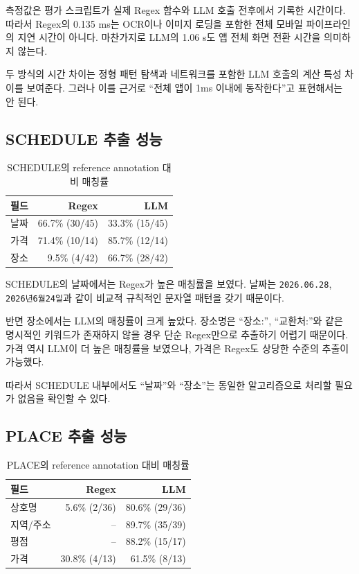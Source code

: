 \documentclass[11pt,a4paper]{article}
\begin{document}
측정값은 평가 스크립트가 실제 Regex 함수와 LLM 호출 전후에서 기록한 시간이다. 따라서 Regex의 0.135 ms는 OCR이나 이미지 로딩을 포함한 전체 모바일 파이프라인의 지연 시간이 아니다. 마찬가지로 LLM의 1.06 s도 앱 전체 화면 전환 시간을 의미하지 않는다.

두 방식의 시간 차이는 정형 패턴 탐색과 네트워크를 포함한 LLM 호출의 계산 특성 차이를 보여준다. 그러나 이를 근거로 ``전체 앱이 1ms 이내에 동작한다''고 표현해서는 안 된다.

\subsection{SCHEDULE 추출 성능}

\begin{table}[H]
\centering
\small
\begin{tabularx}{0.92\linewidth}{l r r}
\toprule
\textbf{필드} & \textbf{Regex} & \textbf{LLM}\\
\midrule
날짜 & 66.7\% (30/45) & 33.3\% (15/45)\\
가격 & 71.4\% (10/14) & 85.7\% (12/14)\\
장소 & 9.5\% (4/42) & 66.7\% (28/42)\\
\bottomrule
\end{tabularx}
\caption{SCHEDULE의 reference annotation 대비 매칭률}
\end{table}

SCHEDULE의 날짜에서는 Regex가 높은 매칭률을 보였다. 날짜는 \texttt{2026.06.28}, \texttt{2026년6월24일}과 같이 비교적 규칙적인 문자열 패턴을 갖기 때문이다.

반면 장소에서는 LLM의 매칭률이 크게 높았다. 장소명은 ``장소:'', ``교환처:''와 같은 명시적인 키워드가 존재하지 않을 경우 단순 Regex만으로 추출하기 어렵기 때문이다. 가격 역시 LLM이 더 높은 매칭률을 보였으나, 가격은 Regex도 상당한 수준의 추출이 가능했다.

따라서 SCHEDULE 내부에서도 ``날짜''와 ``장소''는 동일한 알고리즘으로 처리할 필요가 없음을 확인할 수 있다.

\subsection{PLACE 추출 성능}

\begin{table}[H]
\centering
\small
\begin{tabularx}{0.92\linewidth}{l r r}
\toprule
\textbf{필드} & \textbf{Regex} & \textbf{LLM}\\
\midrule
상호명 & 5.6\% (2/36) & 80.6\% (29/36)\\
지역/주소 & -- & 89.7\% (35/39)\\
평점 & -- & 88.2\% (15/17)\\
가격 & 30.8\% (4/13) & 61.5\% (8/13)\\
\bottomrule
\end{tabularx}
\caption{PLACE의 reference annotation 대비 매칭률}
\end{table}
\end{document}
